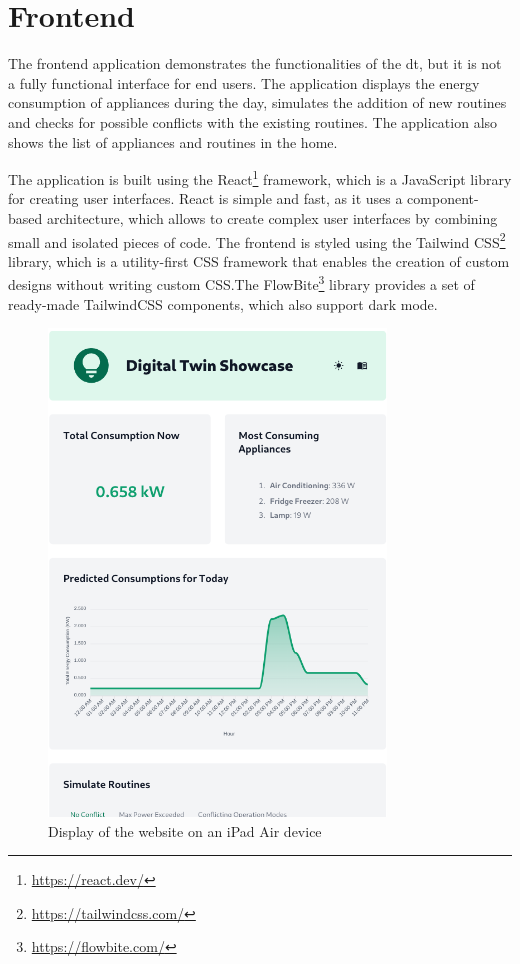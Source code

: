 \section{Frontend}

The frontend application demonstrates the functionalities of the \acrshort{dt}, but it is not a fully functional interface for end users. The application displays the energy consumption of appliances during the day, simulates the addition of new routines and checks for possible conflicts with the existing routines. The application also shows the list of appliances and routines in the home.

The application is built using the React\footnote{\url{https://react.dev/}} framework, which is a JavaScript library for creating user interfaces. React is simple and fast, as it uses a component-based architecture, which allows to create complex user interfaces by combining small and isolated pieces of code. The frontend is styled using the Tailwind CSS\footnote{\url{https://tailwindcss.com/}} library, which is a utility-first CSS framework that enables the creation of custom designs without writing custom CSS.\@ The FlowBite\footnote{\url{https://flowbite.com/}} library provides a set of ready-made TailwindCSS components, which also support dark mode.

\begin{figure}
    \centering
    \includegraphics[width=0.8\textwidth]{images/frontend/responsive.png}
    \caption{Display of the website on an iPad Air device}%
    \label{fig:frontend_responsive}
\end{figure}

